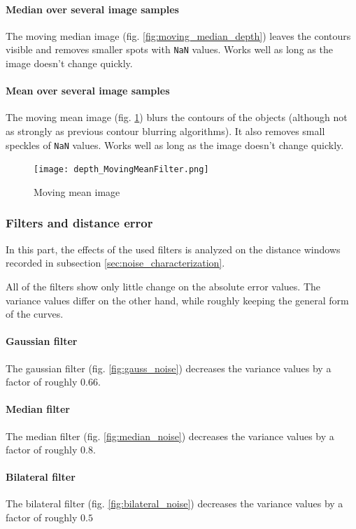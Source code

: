 \documentclass[DIV12,a4paper]{scrartcl}
\begin{document}
\paragraph{Median over several image samples}
The moving median image (fig. \ref{fig:moving_median_depth}) leaves the contours visible and removes smaller spots with \texttt{NaN} values. Works well as long as the image doesn't change quickly.
\paragraph{Mean over several image samples}
The moving mean image (fig. \ref{fig:moving_mean_depth}) blurs the contours of the objects (although not as strongly as previous contour blurring algorithms). It also removes small speckles of \texttt{NaN} values. Works well as long as the image doesn't change quickly.
\begin{figure}[h!tbp]
  \centering
  \texttt{[image: depth\_MovingMeanFilter.png]}
  \caption{Moving mean image}
  \label{fig:moving_mean_depth}
\end{figure}

\newpage
\subsubsection{Filters and distance error}
\label{sec:filters_distance_error}
In this part, the effects of the used filters is analyzed on the distance windows recorded in subsection \ref{sec:noise_characterization}. 
\par
All of the filters show only little change on the absolute error values. The variance values differ on the other hand, while roughly keeping the general form of the curves.

\paragraph{Gaussian filter} The gaussian filter (fig. \ref{fig:gauss_noise}) decreases the variance values by a factor of roughly $0.66$.
\paragraph{Median filter} The median filter (fig. \ref{fig:median_noise}) decreases the variance values by a factor of roughly $0.8$.

\paragraph{Bilateral filter} The bilateral filter (fig. \ref{fig:bilateral_noise}) decreases the variance values by a factor of roughly $0.5$
\end{document}
